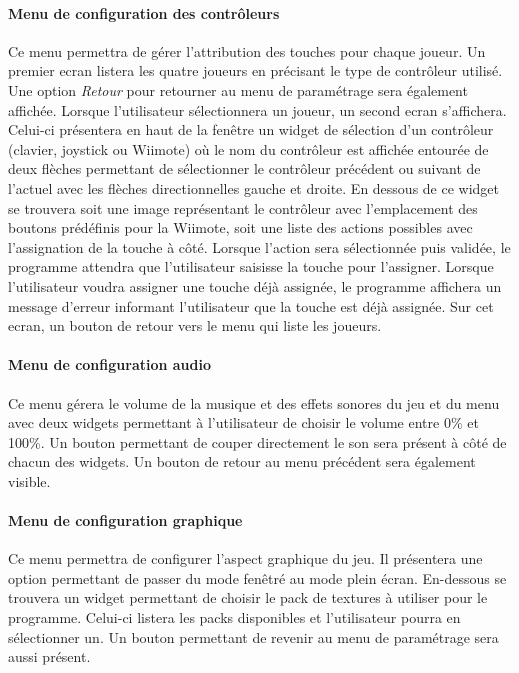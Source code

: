 \paragraph{Menu de configuration des contrôleurs}

Ce menu permettra de gérer l'attribution des touches pour chaque joueur. Un premier ecran listera les quatre joueurs en précisant le type de contrôleur utilisé. Une option \emph{Retour} pour retourner au menu de paramétrage sera également affichée. Lorsque l'utilisateur sélectionnera un joueur, un second ecran s'affichera. Celui-ci présentera en haut de la fenêtre un widget de sélection d'un contrôleur (clavier, joystick ou Wiimote) où le nom du contrôleur est affichée entourée de deux flèches permettant de sélectionner le contrôleur précédent ou suivant de l'actuel avec les flèches directionnelles gauche et droite. En dessous de ce widget se trouvera soit une image représentant le contrôleur avec l'emplacement des boutons prédéfinis pour la Wiimote, soit une liste des actions possibles avec l'assignation de la touche à côté. Lorsque l'action sera sélectionnée puis validée, le programme attendra que l'utilisateur saisisse la touche pour l'assigner. Lorsque l'utilisateur voudra assigner une touche déjà assignée, le programme affichera un message d'erreur informant l'utilisateur que la touche est déjà assignée. Sur cet ecran, un bouton de retour vers le menu qui liste les joueurs.

\paragraph{Menu de configuration audio}

Ce menu gérera le volume de la musique et des effets sonores du jeu et du menu avec deux widgets permettant à l'utilisateur de choisir le volume entre 0\% et 100\%. Un bouton permettant de couper directement le son sera présent à côté de chacun des widgets. Un bouton de retour au menu précédent sera également visible.

\paragraph{Menu de configuration graphique}

Ce menu permettra de configurer l'aspect graphique du jeu. Il présentera une option permettant de passer du mode fenêtré au mode plein écran. En-dessous se trouvera un widget permettant de choisir le pack de textures à utiliser pour le programme. Celui-ci listera les packs disponibles et l'utilisateur pourra en sélectionner un. Un bouton permettant de revenir au menu de paramétrage sera aussi présent.

